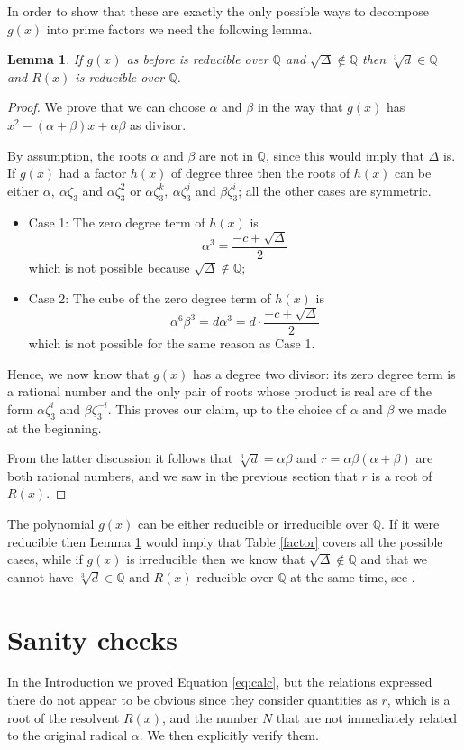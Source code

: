 \documentclass[11pt,a4paper]{article}
\numberwithin{equation}{section}
\newcommand{\Q}{\mathbb{Q}}
\newtheorem{lemma}[teo]{Lemma}
\theoremstyle{definition}
\begin{document}
In order to show that these are exactly the only possible ways to decompose $g(x)$ into prime factors we need the following lemma.
\begin{lemma}
\label{lemma:factor}
 If $g(x)$ as before is reducible over $\Q$ and $\sqrt\Delta\notin\Q$ then $\sqrt[3]{d}\in\Q$ and $R(x)$ is reducible over $\Q$.   
\end{lemma}
\begin{proof}
  We prove that we can choose $\alpha$ and $\beta$ in the way that $g(x)$ has $x^2-(\alpha+\beta)x+\alpha\beta$ as divisor. 
  
  By assumption, the roots $\alpha$ and $\beta$ are not in $\Q$, since this would imply that $\Delta$ is. If $g(x)$ had a factor $h(x)$ of degree three then the roots of $h(x)$ can be either $\alpha,\:\alpha\zeta_3$ and $\alpha\zeta_3^2$ or $\alpha\zeta_3^k,\:\alpha\zeta_3^j$ and $\beta\zeta_3^i$; all the other cases are symmetric.
  \begin{itemize}
    \item Case 1: The zero degree term of $h(x)$ is \[\alpha^3=\dfrac{-c+\sqrt\Delta}{2}\] which is not    possible because $\sqrt\Delta\notin\Q$;
    \item Case 2: The cube of the zero degree term of $h(x)$ is \[\alpha^6\beta^3=d\alpha^3=d\cdot\dfrac{-c+\sqrt\Delta}{2}\] which is not possible for the same reason as Case 1.
  \end{itemize}
  Hence, we now know that $g(x)$ has a degree two divisor: its zero degree term is a rational number and the only pair of roots whose product is real are of the form $\alpha\zeta_3^i$ and $\beta\zeta_3^{-i}$. This proves our claim, up to the choice of $\alpha$ and $\beta$ we made at the beginning.
  
  From the latter discussion it follows that $\sqrt[3]{d}=\alpha\beta$ and $r=\alpha\beta(\alpha+\beta)$ are both rational numbers, and we saw in the previous section that $r$ is a root of $R(x)$.    
\end{proof}
The polynomial $g(x)$ can be either reducible or irreducible over $\Q$. If it were reducible then Lemma \ref{lemma:factor} would imply that Table \ref{factor} covers all the possible cases, while if $g(x)$ is irreducible then we know that $\sqrt\Delta\notin\Q$ and that we cannot have $\sqrt[3]{d}\in\Q$ and $R(x)$ reducible over $\Q$ at the same time, see \cite[Lemma 2.4]{Cavallo}.

\section{Sanity checks}
\label{section:four}
In the Introduction we proved Equation \eqref{eq:calc}, but the relations expressed there do not appear to be obvious since they consider quantities as $r$, which is a root of the resolvent $R(x)$, and the number $N$ that are not immediately related to the original radical $\alpha$. We then explicitly verify them.
\end{document}

